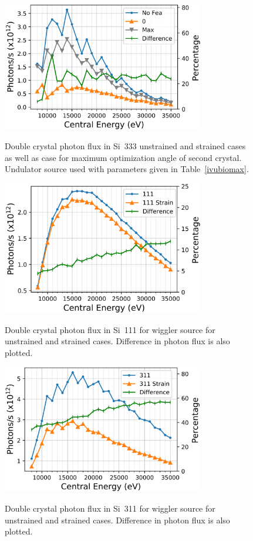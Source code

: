 \documentclass{iucr}
\begin{document}
\begin{figure}
\caption{Double crystal photon flux in Si~333 unstrained and strained cases as well as case for maximum optimization angle of second crystal. Undulator source used with parameters given in Table~\ref{ivubiomax}.}
\includegraphics[width = 8.85cm]{images/maxangleflux.png}
\label{fig:maxangleflux}
\end{figure}

\begin{figure}
\caption{Double crystal photon flux in Si~111 for wiggler source for unstrained and strained cases. Difference in photon flux is also plotted.}
\includegraphics[width = 8.85cm]{images/ivw111flux.png}
\label{fig:ivw111flux}
\end{figure}

\begin{figure}
\caption{Double crystal photon flux in Si~311 for wiggler source for unstrained and strained cases. Difference in photon flux is also plotted.}
\includegraphics[width = 8.85cm]{images/ivw311flux.png}
\label{fig:ivw311flux}
\end{figure}
\end{document}
